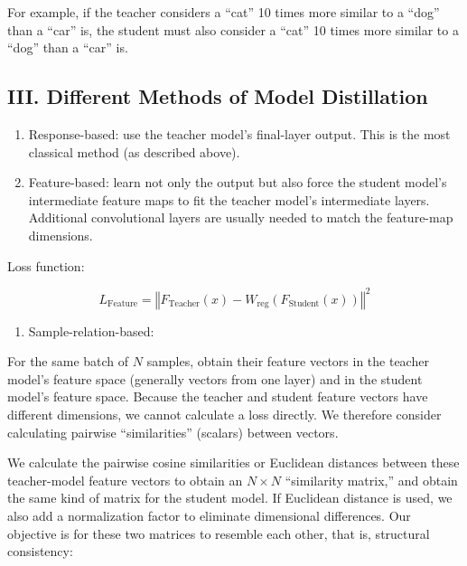 For example, if the teacher considers a ``cat'' 10 times more similar to a ``dog'' than a ``car'' is, the student must also consider a ``cat'' 10 times more similar to a ``dog'' than a ``car'' is.

\hypertarget{iii.-different-methods-of-model-distillation}{%
\subsection{III. Different Methods of Model Distillation}\label{iii.-different-methods-of-model-distillation}}

\begin{enumerate}
\def\labelenumi{\arabic{enumi}.}
\item
  Response-based: use the teacher model's final-layer output. This is the most classical method (as described above).
\item
  Feature-based: learn not only the output but also force the student model's intermediate feature maps to fit the teacher model's intermediate layers. Additional convolutional layers are usually needed to match the feature-map dimensions.
\end{enumerate}

Loss function:

\[
L_{\mathrm{Feature}} = \left\Vert F_{\mathrm{Teacher}}(x) - W_{\mathrm{reg}}\left(F_{\mathrm{Student}}(x)\right) \right\Vert^2
\]

\begin{enumerate}
\def\labelenumi{\arabic{enumi}.}
\setcounter{enumi}{2}
\tightlist
\item
{}
  Sample-relation-based:
\end{enumerate}

For the same batch of \(N\) samples, obtain their feature vectors in the teacher model's feature space (generally vectors from one layer) and in the student model's feature space. Because the teacher and student feature vectors have different dimensions, we cannot calculate a loss directly. We therefore consider calculating pairwise ``similarities'' (scalars) between vectors.

We calculate the pairwise cosine similarities or Euclidean distances between these teacher-model feature vectors to obtain an \(N \times N\) ``similarity matrix,'' and obtain the same kind of matrix for the student model. If Euclidean distance is used, we also add a normalization factor to eliminate dimensional differences. Our objective is for these two matrices to resemble each other, that is, structural consistency:

